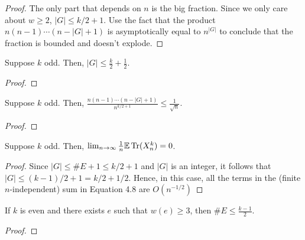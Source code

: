 \begin{proof}
  \notready
  The only part that depends on $n$ is the big fraction. Since we only care about $w \ge 2$, $|G| \le k/2 + 1$. Use the fact that the product $n(n-1)\cdots (n-|G|+1)$ is asymptotically equal to $n^{|G|}$ to conclude that the fraction is bounded and doesn't explode.
\end{proof}

\begin{lemma}
  \label{lemma:odd_vertex_bound}
  \notready
  Suppose $k$ odd. Then, $|G| \le \frac{k}{2} + \frac{1}{2}$.
\end{lemma}

\begin{proof}
  \notready
\end{proof}

\begin{lemma}
  \label{lemma:odd_ratio_bound}
  \notready
  Suppose $k$ odd. Then, $\frac{n(n-1)\cdots(n-|G|+1)}{n^{k/2+1}} \le \frac{1}{\sqrt{n}}$.
\end{lemma}

\begin{proof}
  \notready
\end{proof}




\begin{proposition}
  \label{prop:odd_case}
  \notready
  Suppose $k$ odd. Then, $\lim_{n\to\infty} \frac{1}{n}\mathbb{E}\operatorname{Tr}(X_n^k) = 0$.
\end{proposition}

\begin{proof}
  \notready
  Since $|G|\le \#E+1 \le k/2+1$ and $|G|$ is an integer, it follows that $|G|\le (k-1)/2+1 = k/2 + 1/2$.  Hence, in this case, all the terms in the (finite $n$-independent) sum in Equation 4.8 are $O(n^{-1/2})$
\end{proof}

\begin{lemma}
  \label{lemma:edge_bound_large_w}
  \notready
  If $k$ is even and there exists $e$ such that $w(e) \ge 3$, then $\#E \le \frac{k-1}{2}$.
\end{lemma}

\begin{proof}
  \notready
\end{proof}



